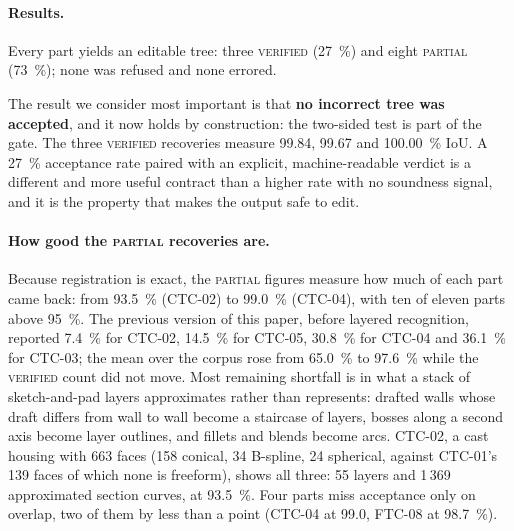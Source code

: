 \documentclass[11pt]{article}
\newcommand{\VERIFIED}{\textsc{verified}}
\newcommand{\PARTIAL}{\textsc{partial}}
\begin{document}
\paragraph{Results.} Every part yields an editable tree: three \VERIFIED{}
(\SI{27}{\percent}) and eight \PARTIAL{} (\SI{73}{\percent}); none was refused
and none errored.

The result we consider most important is that \textbf{no incorrect tree was
accepted}, and it now holds by construction: the two-sided test is part of the
gate. The three \VERIFIED{} recoveries measure 99.84, 99.67 and
\SI{100.00}{\percent} IoU. A \SI{27}{\percent} acceptance rate paired with an
explicit, machine-readable verdict is a different and more useful contract than
a higher rate with no soundness signal, and it is the property that makes the
output safe to edit.

\paragraph{How good the \PARTIAL{} recoveries are.} Because registration is
exact, the \PARTIAL{} figures measure how much of each part came back:
from \SI{93.5}{\percent} (CTC-02) to \SI{99.0}{\percent} (CTC-04), with ten of
eleven parts above \SI{95}{\percent}. The previous version of this paper, before
layered recognition, reported \SI{7.4}{\percent} for CTC-02,
\SI{14.5}{\percent} for CTC-05, \SI{30.8}{\percent} for CTC-04 and
\SI{36.1}{\percent} for CTC-03; the mean over the corpus rose from
\SI{65.0}{\percent} to \SI{97.6}{\percent} while the \VERIFIED{} count did not
move. Most remaining shortfall is in what a stack of sketch-and-pad layers
approximates rather than represents: drafted walls whose draft differs from wall
to wall become a staircase of layers, bosses along a second axis become layer
outlines, and fillets and blends become arcs. CTC-02, a cast housing with 663
faces (158 conical, 34 B-spline, 24 spherical, against CTC-01's 139 faces of
which none is freeform), shows all three: 55 layers and 1\,369 approximated
section curves, at \SI{93.5}{\percent}. Four parts miss acceptance only on
overlap, two of them by less than a point (CTC-04 at 99.0, FTC-08 at
\SI{98.7}{\percent}).
\end{document}
